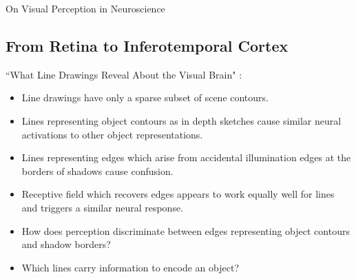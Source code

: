 \documentclass[11pt]{article}
\begin{document}
\begin{center}
{\LARGE On Visual Perception in Neuroscience} 
\end{center}

\subsection*{From Retina to Inferotemporal Cortex}

``What Line Drawings Reveal About the Visual Brain" \cite{bilge11}:
\begin{itemize}
	\item Line drawings have only a sparse subset of scene contours.
	\item Lines representing object contours as in depth sketches cause similar neural activations to other object representations.
	\item Lines representing edges which arise from accidental illumination edges at the borders of shadows cause confusion.
	\item Receptive field which recovers edges appears to work equally well for lines and triggers a similar neural response.
	\item How does perception discriminate between edges representing object contours and shadow borders?
	\item Which lines carry information to encode an object?
\end{itemize}
\end{document}
